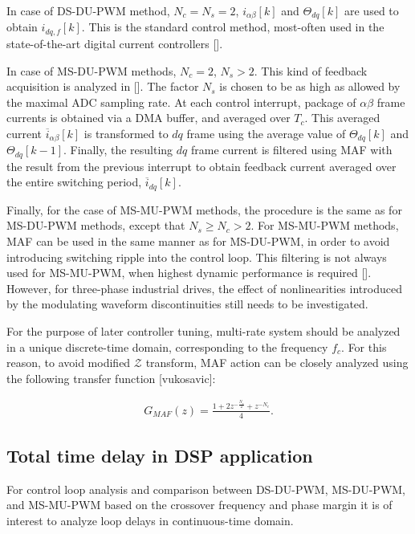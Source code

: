 \documentclass[journal]{IEEEtran}
\begin{document}
In case of DS-DU-PWM method, $N_c = N_s = 2$, $i_{\alpha \beta}[k]$ and $\Theta_{dq}[k]$ are used to obtain $i_{dq,f}[k]$. This is the standard control method, most-often used in the state-of-the-art digital current controllers []. 

In case of MS-DU-PWM methods, $N_c = 2$, $N_s>2$. This kind of feedback acquisition is analyzed in []. The factor $N_s$ is chosen to be as high as allowed by the maximal ADC sampling rate. At each control interrupt, package of $\alpha \beta$ frame currents is obtained via a DMA buffer, and averaged over $T_c$. This averaged current $\overline{i}_{\alpha \beta}[k]$ is transformed to $dq$ frame using the average value of $\Theta_{dq}[k]$ and $\Theta_{dq}[k-1]$. Finally, the resulting $dq$ frame current is filtered using MAF with the result from the previous interrupt to obtain feedback current averaged over the entire switching period, $\overline{i}_{dq}[k]$. 

Finally, for the case of MS-MU-PWM methods, the procedure is the same as for MS-DU-PWM methods, except that $N_s \geq N_c > 2$. For MS-MU-PWM methods, MAF can be used in the same manner as for MS-DU-PWM, in order to avoid introducing switching ripple into the control loop. This filtering is not always used for MS-MU-PWM, when highest dynamic performance is required []. However, for three-phase industrial drives, the effect of nonlinearities introduced by the modulating waveform discontinuities still needs to be investigated. 

For the purpose of later controller tuning, multi-rate system should be analyzed in a unique discrete-time domain, corresponding to the frequency $f_c$. For this reason, to avoid modified $\mathcal{Z}$ transform, MAF action can be closely analyzed using the following transfer function [vukosavic]:

\begin{equation}
\begin{aligned}
G_{MAF}(z) = \frac{1 + 2z^{-\frac{N_c}{2}} + z^{-N_c}}{4}.
\label{eq:MAF} 
\end{aligned}    
\end{equation}


\subsection{Total time delay in DSP application}

For control loop analysis and comparison between DS-DU-PWM, MS-DU-PWM, and MS-MU-PWM based on the crossover frequency and phase margin it is of interest to analyze loop delays in continuous-time domain.
\end{document}
